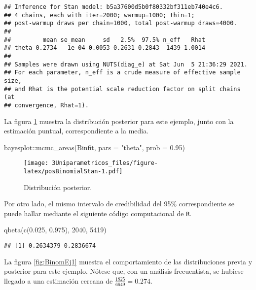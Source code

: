 \documentclass[
  12pt,
  spanish,
]{book}
\newenvironment{Shaded}{\begin{snugshade}}{\end{snugshade}}
\newcommand{\AttributeTok}[1]{\textcolor[rgb]{0.77,0.63,0.00}{#1}}
\newcommand{\DecValTok}[1]{\textcolor[rgb]{0.00,0.00,0.81}{#1}}
\newcommand{\FloatTok}[1]{\textcolor[rgb]{0.00,0.00,0.81}{#1}}
\newcommand{\FunctionTok}[1]{\textcolor[rgb]{0.00,0.00,0.00}{#1}}
\newcommand{\NormalTok}[1]{#1}
\newcommand{\SpecialCharTok}[1]{\textcolor[rgb]{0.00,0.00,0.00}{#1}}
\newcommand{\StringTok}[1]{\textcolor[rgb]{0.31,0.60,0.02}{#1}}
\theoremstyle{definition}
\theoremstyle{definition}
\theoremstyle{definition}
\theoremstyle{definition}
\theoremstyle{remark}
\begin{document}
\begin{verbatim}
## Inference for Stan model: b5a37600d5b0f80332bf311eb740e4c6.
## 4 chains, each with iter=2000; warmup=1000; thin=1; 
## post-warmup draws per chain=1000, total post-warmup draws=4000.
## 
##         mean se_mean     sd   2.5%  97.5% n_eff   Rhat
## theta 0.2734   1e-04 0.0053 0.2631 0.2843  1439 1.0014
## 
## Samples were drawn using NUTS(diag_e) at Sat Jun  5 21:36:29 2021.
## For each parameter, n_eff is a crude measure of effective sample size,
## and Rhat is the potential scale reduction factor on split chains (at 
## convergence, Rhat=1).
\end{verbatim}

La figura \ref{fig:posBinomialStan} muestra la distribución posterior para este ejemplo, junto con la estimación puntual, correspondiente a la media.

\begin{Shaded}
\begin{Highlighting}[]
\NormalTok{bayesplot}\SpecialCharTok{::}\FunctionTok{mcmc\_areas}\NormalTok{(Binfit, }\AttributeTok{pars =} \StringTok{"theta"}\NormalTok{, }
                      \AttributeTok{prob =} \FloatTok{0.95}\NormalTok{)}
\end{Highlighting}
\end{Shaded}

\begin{figure}
\centering
\texttt{[image: 3Uniparametricos\_files/figure-latex/posBinomialStan-1.pdf]}
\caption{\label{fig:posBinomialStan}Distribución posterior.}
\end{figure}

Por otro lado, el mismo intervalo de credibilidad del 95\% correspondiente se puede hallar mediante el siguiente código computacional de \texttt{R}.

\begin{Shaded}
\begin{Highlighting}[]
\FunctionTok{qbeta}\NormalTok{(}\FunctionTok{c}\NormalTok{(}\FloatTok{0.025}\NormalTok{, }\FloatTok{0.975}\NormalTok{), }\DecValTok{2040}\NormalTok{, }\DecValTok{5419}\NormalTok{)}
\end{Highlighting}
\end{Shaded}

\begin{verbatim}
## [1] 0.2634379 0.2836674
\end{verbatim}

La figura \ref{fig:BinomEj1} muestra el comportamiento de las distribuciones previa y posterior para este ejemplo. Nótese que, con un análisis frecuentista, se hubiese llegado a una estimación cercana de \(\frac{1825}{6649}=0.274\).
\end{document}
